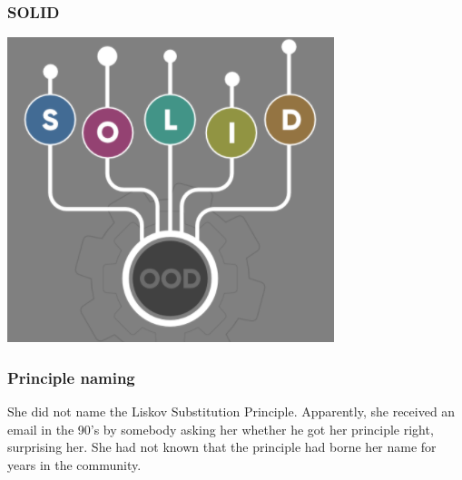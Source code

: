 \documentclass{beamer}
\begin{document}
\begin{frame}
\frametitle{SOLID} 

\includegraphics[scale=0.8]{SOLID}
\centering


\end{frame}


\begin{frame}
\frametitle{Principle naming}
She did not name the Liskov Substitution Principle. Apparently, she received an email in the 90’s by somebody asking her whether he got her principle right, surprising her. She had not known that the principle had borne her name for years in the community.
\end{frame}
\end{document}

